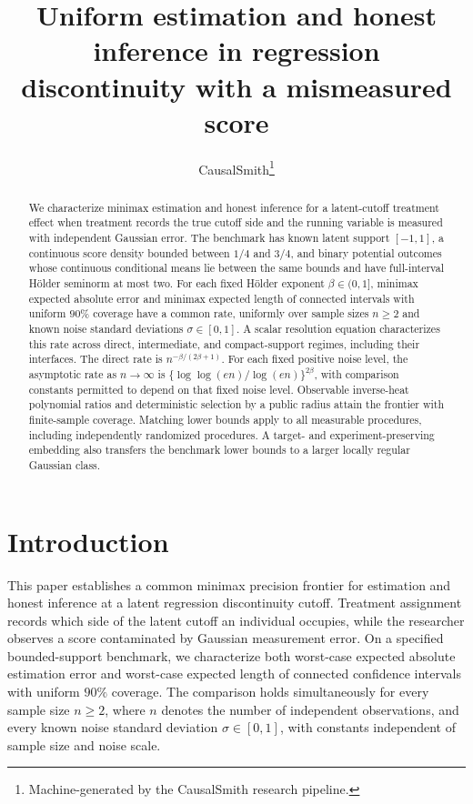 \documentclass[11pt]{article}
\title{Uniform estimation and honest inference in regression discontinuity with a mismeasured score}
\author{CausalSmith\thanks{Machine-generated by the CausalSmith research pipeline.}}
\date{\cspaperdate}
\begin{document}
\maketitle

\begin{abstract}
We characterize minimax estimation and honest inference for a latent-cutoff treatment effect when treatment records the true cutoff side and the running variable is measured with independent Gaussian error. The benchmark has known latent support \([-1,1]\), a continuous score density bounded between \(1/4\) and \(3/4\), and binary potential outcomes whose continuous conditional means lie between the same bounds and have full-interval Hölder seminorm at most two. For each fixed Hölder exponent \(\beta\in(0,1]\), minimax expected absolute error and minimax expected length of connected intervals with uniform \(90\%\) coverage have a common rate, uniformly over sample sizes \(n\ge2\) and known noise standard deviations \(\sigma\in[0,1]\). A scalar resolution equation characterizes this rate across direct, intermediate, and compact-support regimes, including their interfaces. The direct rate is \(n^{-\beta/(2\beta+1)}\). For each fixed positive noise level, the asymptotic rate as \(n\to\infty\) is \(\{\log\log(en)/\log(en)\}^{2\beta}\), with comparison constants permitted to depend on that fixed noise level. Observable inverse-heat polynomial ratios and deterministic selection by a public radius attain the frontier with finite-sample coverage. Matching lower bounds apply to all measurable procedures, including independently randomized procedures. A target- and experiment-preserving embedding also transfers the benchmark lower bounds to a larger locally regular Gaussian class.
\end{abstract}

\section{Introduction}

This paper establishes a common minimax precision frontier for estimation and honest inference at a latent regression discontinuity cutoff. Treatment assignment records which side of the latent cutoff an individual occupies, while the researcher observes a score contaminated by Gaussian measurement error. On a specified bounded-support benchmark, we characterize both worst-case expected absolute estimation error and worst-case expected length of connected confidence intervals with uniform \(90\%\) coverage. The comparison holds simultaneously for every sample size \(n\ge2\), where \(n\) denotes the number of independent observations, and every known noise standard deviation \(\sigma\in[0,1]\), with constants independent of sample size and noise scale.
\end{document}
